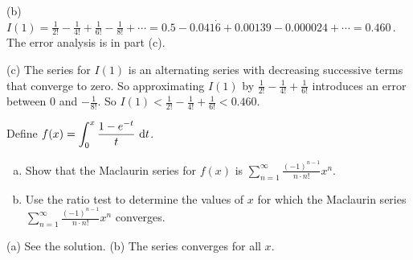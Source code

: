 \begin{solution}
\noindent (b)
$I(1)=\frac{1}{2!}-\frac{1}{4!}+\frac{1}{6!}-\frac{1}{8!}+\cdots
=0.5-0.041\dot6+0.00139-0.000024+\cdots=\boxed{0.460}\,$.
The error analysis is in part (c).

\noindent (c) The series for $I(1)$ is an alternating series with decreasing
successive terms that converge to zero. So approximating
$I(1)$ by $\frac{1}{2!}-\frac{1}{4!}+\frac{1}{6!}$ introduces an error
between $0$ and $-\frac{1}{8!}$. So  $I(1)<\frac{1}{2!}-\frac{1}{4!}+\frac{1}{6!}<0.460$.

\end{solution}

\begin{question}[2016A]
Define
$
{\displaystyle f(x) = \int_0^x\frac{1-e^{-t}}{t}\ \mathrm{d}t}
$.
\begin{enumerate}[(a)]
\item
Show that the Maclaurin series for $f(x)$ is
$\displaystyle\sum_{n=1}^\infty \frac{(-1)^{n-1}}{n\cdot n!} x^n$.

\item
Use the ratio test to determine the values of $x$ for which
the Maclaurin series
$\displaystyle\sum_{n=1}^\infty \frac{(-1)^{n-1}}{n\cdot n!} x^n$ converges.
\end{enumerate}
\end{question}


\begin{answer}
(a) See the solution.
\qquad
(b) The series converges for all $x$.
\end{answer}

